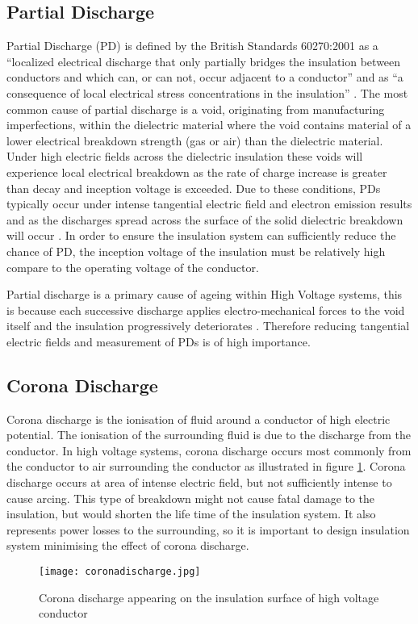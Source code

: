 \subsection{Partial Discharge}
Partial Discharge (PD) is defined by the British Standards 60270:2001 as a “localized electrical discharge that only partially bridges the insulation between conductors and which can, or can not, occur adjacent to a conductor” and as “a consequence of local electrical stress concentrations in the insulation” \cite{60270}. The most common cause of partial discharge is a void, originating from manufacturing imperfections, within the dielectric material where the void contains material of a lower electrical breakdown strength (gas or air) than the dielectric material. Under high electric fields across the dielectric insulation these voids will experience local electrical breakdown as the rate of charge increase is greater than decay and inception voltage is exceeded. Due to these conditions, PDs typically occur under intense tangential electric field and electron emission results \cite{surfaceflashover} and as the discharges spread across the surface of the solid dielectric breakdown will occur \cite{kuffel2000high}. In order to ensure the insulation system can sufficiently reduce the chance of PD, the inception voltage of the insulation must be relatively high compare to the operating voltage of the conductor.

Partial discharge is a primary cause of ageing within High Voltage systems, this is because each successive discharge applies electro-mechanical forces to the void itself and the insulation progressively deteriorates \cite{PDageing}. Therefore reducing tangential electric fields and measurement of PDs is of high importance. 

\subsection{Corona Discharge}
Corona discharge is the ionisation of fluid around a conductor of high electric potential. The ionisation of the surrounding fluid is due to the discharge from the conductor. In high voltage systems, corona discharge occurs most commonly from the conductor to air surrounding the conductor as illustrated in figure \ref{figure:corona}. Corona discharge occurs at area of intense electric field, but not sufficiently intense to cause arcing. This type of breakdown might not cause fatal damage to the insulation, but would shorten the life time of the insulation system. It also represents power losses to the surrounding, so it is important to design insulation system minimising the effect of corona discharge.

\begin{figure}[!h]
   \centering
   \texttt{[image: coronadischarge.jpg]}
   \caption{Corona discharge appearing on the insulation surface of high voltage conductor}
   \label{figure:corona}
\end{figure}
